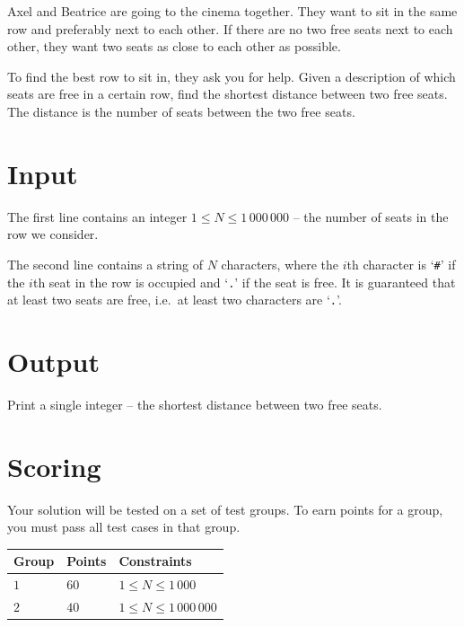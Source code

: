 
Axel and Beatrice are going to the cinema together.
They want to sit in the same row and preferably next to each other.
If there are no two free seats next to each other, they want two seats as close to each other as possible.

To find the best row to sit in, they ask you for help.
Given a description of which seats are free in a certain row,
find the shortest distance between two free seats. The distance is the number of seats between the two free seats.


\section*{Input}
The first line contains an integer $1 \le N \le 1\,000\,000$ -- the number of seats in the row we consider.

The second line contains a string of $N$ characters,
where the $i$th character is `\texttt{\#}' if the $i$th seat in the row is occupied and `\texttt{.}' if the seat is free.
It is guaranteed that at least two seats are free, i.e.\ at least two characters are `\texttt{.}'.

\section*{Output}
Print a single integer -- the shortest distance between two free seats.

\section*{Scoring}
Your solution will be tested on a set of test groups.
To earn points for a group, you must pass all test cases in that group.

\noindent
\begin{tabular}{| l | l | l |}
  \hline
  Group & Points & Constraints \\ \hline
  $1$    & $60$        &  $1 \le N \le 1\,000$ \\ \hline
  $2$    & $40$        &  $1 \le N \le 1\,000\,000$ \\ \hline
\end{tabular}
